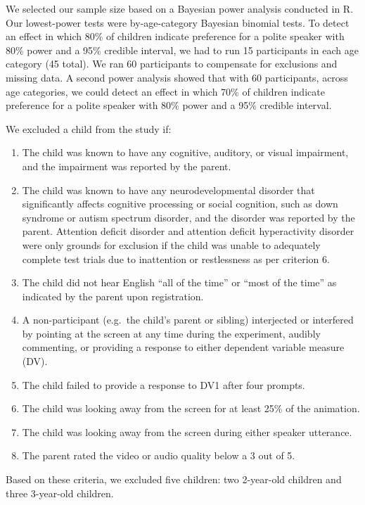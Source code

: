 \documentclass[
  english,
  man,floatsintext]{apa6}
\begin{document}
We selected our sample size based on a Bayesian power analysis conducted in R. Our lowest-power tests were by-age-category Bayesian binomial tests. To detect an effect in which 80\% of children indicate preference for a polite speaker with 80\% power and a 95\% credible interval, we had to run 15 participants in each age category (45 total). We ran 60 participants to compensate for exclusions and missing data. A second power analysis showed that with 60 participants, across age categories, we could detect an effect in which 70\% of children indicate preference for a polite speaker with 80\% power and a 95\% credible interval.

We excluded a child from the study if:

\begin{enumerate}
\def\labelenumi{\arabic{enumi}.}
\item
  The child was known to have any cognitive, auditory, or visual impairment, and the impairment was reported by the parent.
\item
  The child was known to have any neurodevelopmental disorder that significantly affects cognitive processing or social cognition, such as down syndrome or autism spectrum disorder, and the disorder was reported by the parent. Attention deficit disorder and attention deficit hyperactivity disorder were only grounds for exclusion if the child was unable to adequately complete test trials due to inattention or restlessness as per criterion 6.
\item
  The child did not hear English ``all of the time'' or ``most of the time'' as indicated by the parent upon registration.
\item
  A non-participant (e.g.~the child's parent or sibling) interjected or interfered by pointing at the screen at any time during the experiment, audibly commenting, or providing a response to either dependent variable measure (DV).
\item
  The child failed to provide a response to DV1 after four prompts.
\item
  The child was looking away from the screen for at least 25\% of the animation.
\item
  The child was looking away from the screen during either speaker utterance.
\item
  The parent rated the video or audio quality below a 3 out of 5.
\end{enumerate}

Based on these criteria, we excluded five children: two 2-year-old children and three 3-year-old children.
\end{document}
